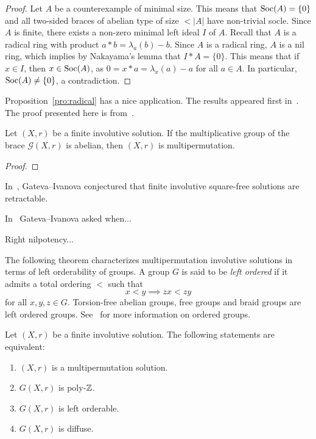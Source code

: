 \begin{proof}
Let $A$ be a counterexample of minimal size. This means that $\operatorname{Soc}(A)=\{0\}$ 
and all two-sided braces of abelian type of size $<|A|$ have non-trivial socle. 
Since $A$ is finite, there exists a non-zero minimal left ideal $I$ of $A$.
Recall that $A$ is a radical ring with product $a*b=\lambda_a(b)-b$. 
Since $A$ is a radical ring, $A$ is a nil ring, which implies by 
Nakayama's lemma that $I*A=\{0\}$. This means that if $x\in I$, 
then $x\in\operatorname{Soc}(A)$, as $0=x*a=\lambda_x(a)-a$ for all $a\in A$. 
In particular, $\operatorname{Soc}(A)\ne\{0\}$, a contradiction. 
\end{proof}

Proposition~\ref{pro:radical} has a nice application. The results appeared first in~\cite{MR2652212}. 
The proof presented here is from~\cite{MR3177933}. 

\begin{theorem}
\label{thm:CJO_abelian}
    Let $(X,r)$ be a finite involutive solution. If the multiplicative group of the brace 
    $\mathcal{G}(X,r)$ is abelian, then $(X,r)$ is multipermutation. 
\end{theorem}

\begin{proof}
    
\end{proof}



In~\cite{MR2095675}, Gateva--Ivanova conjectured that finite involutive 
square-free solutions are retractable.


In~\cite{MR3861714} Gateva--Ivanova asked when...

Right nilpotency...

The following theorem characterizes multipermutation involutive solutions in 
terms of left orderability of groups. A group $G$ is said to be 
\emph{left ordered} if it admits a total ordering $<$ such that 
\[
x<y\implies zx<zy
\]
for all $x,y,z\in G$. Torsion-free abelian groups, 
free groups and braid groups are left ordered groups. 
See~\cite{MR3560661} for more information on ordered groups. 

 \begin{theorem}
\label{thm:BCV}
	Let $(X,r)$ be a finite involutive solution. The following statements are equivalent:
	\begin{enumerate}
		\item $(X,r)$ is a multipermutation solution.
		\item $G(X,r)$ is poly-$\mathbb{Z}$.
		\item $G(X,r)$ is left orderable.
		\item $G(X,r)$ is diffuse.
	\end{enumerate}
\end{theorem}

